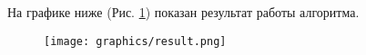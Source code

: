 На графике ниже (Рис. \ref{result}) показан результат работы алгоритма. 

\begin{figure}[H]
\centering
\texttt{[image: graphics/result.png]}
\caption{}
\label{result}
\end{figure}










































